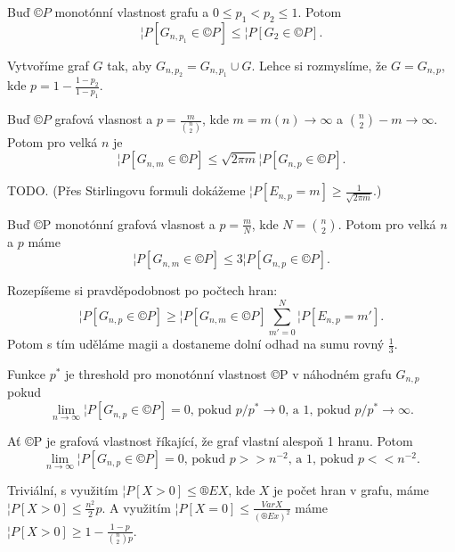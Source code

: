 \documentclass[12pt]{article}					%
\begin{document}
    \begin{lemma}
        Buď $©P$ monotónní vlastnost grafu a $0 ≤ p_1 < p_2 ≤ 1$. Potom
        $$ ¦P[G_{n, p_1} \in ©P] ≤ ¦P[G_2 \in ©P]. $$

        \begin{dukazin}
            Vytvoříme graf $G$ tak, aby $G_{n, p_2} = G_{n, p_1} \cup G$. Lehce si rozmyslíme, že $G = G_{n, p}$, kde $p = 1 - \frac{1 - p_2}{1 - p_1}$.
        \end{dukazin}
    \end{lemma}

    \begin{lemma}
        Buď $©P$ grafová vlasnost a $p = \frac{m}{\binom{n}{2}}$, kde $m = m(n) \rightarrow ∞$ a $\binom{n}{2} - m \rightarrow ∞$. Potom pro velká $n$ je
        $$ ¦P[G_{n, m} \in ©P] ≤ \sqrt{2 \pi m}¦P[G_{n, p} \in ©P]. $$ 

        \begin{dukazin}
                TODO. (Přes Stirlingovu formuli dokážeme $¦P[E_{n, p} = m] ≥ \frac{1}{\sqrt{2\pi m}}$.)
        \end{dukazin}
    \end{lemma}

    \begin{lemma}
        Buď ©P monotónní grafová vlasnost a $p = \frac{m}{N}$, kde $N = \binom{n}{2}$. Potom pro velká $n$ a $p$ máme
        $$ ¦P[G_{n, m} \in ©P] ≤ 3¦P[G_{n, p} \in ©P]. $$

        \begin{dukazin}
            Rozepíšeme si pravděpodobnost po počtech hran:
            $$ ¦P[G_{n, p} \in ©P] ≥ ¦P[G_{n, m} \in ©P]\sum_{m'=0}^N ¦P[E_{n, p} = m']. $$
            Potom s tím uděláme magii a dostaneme dolní odhad na sumu rovný $\frac{1}{3}$.
        \end{dukazin}
    \end{lemma}

    \begin{definice}[Threshold]
        Funkce $p^*$ je threshold pro monotónní vlastnost ©P v náhodném grafu $G_{n, p}$ pokud
        $$ \lim_{n \rightarrow ∞} ¦P[G_{n, p} \in ©P] = 0 \text{, pokud $p/p^* \rightarrow 0$, a $1$, pokud $p/p^* \rightarrow ∞$.} $$ 
    \end{definice}

    \begin{lemma}
        Ať ©P je grafová vlastnost říkající, že graf vlastní alespoň 1 hranu. Potom
        $$ \lim_{n \rightarrow ∞} ¦P[G_{n, p} \in ©P] = 0\text{, pokud $p >> n^{-2}$, a 1, pokud $p << n^{-2}$.} $$

        \begin{dukazin}
            Triviální, s využitím $¦P[X > 0] ≤ ®E X$, kde $X$ je počet hran v grafu, máme $¦P[X > 0] ≤ \frac{n^2}{2}p$. A využitím $¦P[X = 0] ≤ \frac{Var X}{(®E x)^2}$ máme $¦P[X > 0] ≥ 1 - \frac{1-p}{\binom{n}{2}p}$.
        \end{dukazin}
    \end{lemma}
\end{document}
